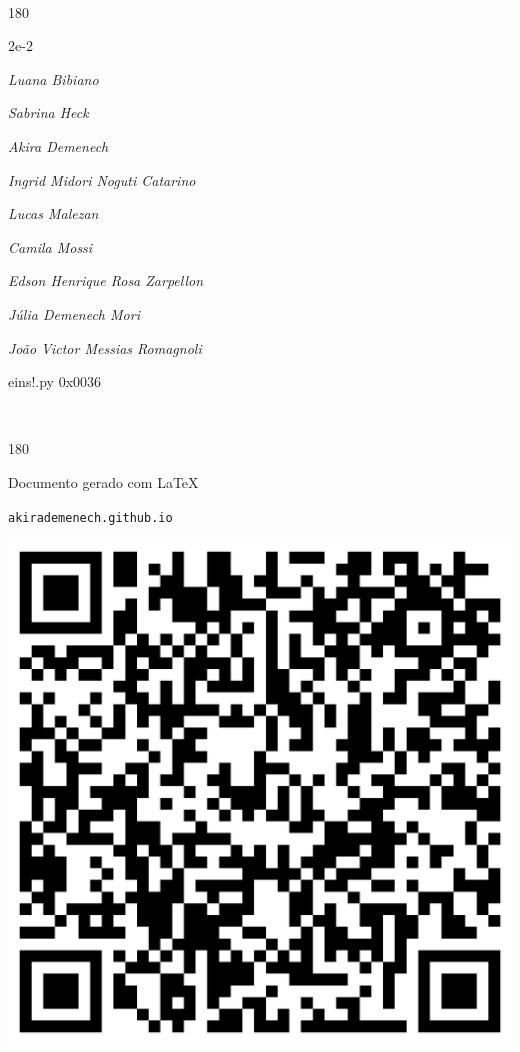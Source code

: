 \documentclass[12pt]{article}
\begin{document}
	\ 
	\vfill
	\begin{turn}{180}	
		\begin{minipage}{\textwidth}
		  	\ttfamily %
			\centering
			{\Huge 2e-2}
		  
			\hfill
		  
			

\textit{\small Luana Bibiano}

\textit{\small Sabrina Heck}

\textit{\small Akira Demenech}

\textit{\small Ingrid Midori Noguti Catarino}

\textit{\small Lucas Malezan}

\textit{\small Camila Mossi}

\textit{\small Edson Henrique Rosa Zarpellon}

\textit{\small Júlia Demenech Mori}

\textit{\small João Victor Messias Romagnoli}

\bigskip

eins!.py
0x0036


		\end{minipage}	
	\end{turn}
	\vfill
	\

\pagebreak

	\begin{turn}{180}	
		\begin{minipage}{\textwidth}		  
		  Documento gerado com \LaTeX			
		  
		  \texttt{akirademenech.github.io}

		  \includegraphics[height=0.3\textheight]{2e-2.pdf}

		\end{minipage}	
	\end{turn}  
		  
\end{document}
